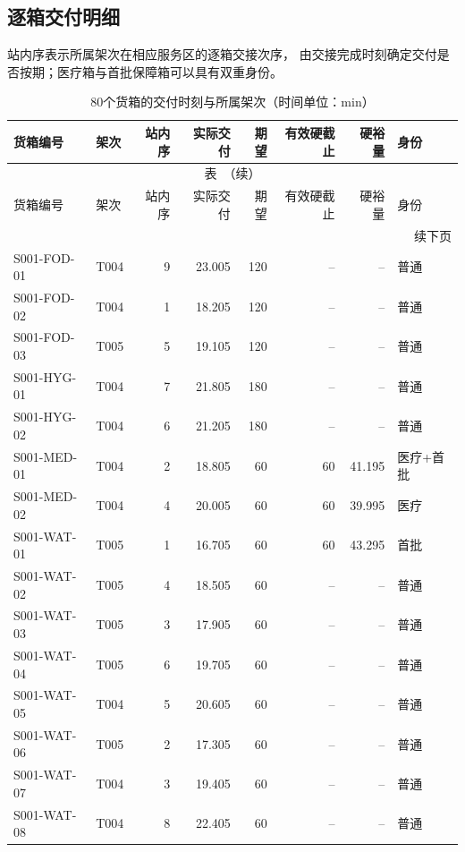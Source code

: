 \subsection{逐箱交付明细}
站内序表示所属架次在相应服务区的逐箱交接次序，
由交接完成时刻确定交付是否按期；医疗箱与首批保障箱可以具有双重身份。
\begingroup
\small
\setlength{\tabcolsep}{3pt}
\renewcommand{\arraystretch}{1.10}
\begin{longtable}{@{}llrrrrrl@{}}
\caption{80个货箱的交付时刻与所属架次（时间单位：min）}\label{tab:q3-deliveries}\\
\toprule
货箱编号 & 架次 & 站内序 & 实际交付 & 期望 & 有效硬截止 & 硬裕量 & 身份 \\
\midrule
\endfirsthead
\multicolumn{8}{c}{\small 表~\thetable{}（续）}\\
\toprule
货箱编号 & 架次 & 站内序 & 实际交付 & 期望 & 有效硬截止 & 硬裕量 & 身份 \\
\midrule
\endhead
\midrule
\multicolumn{8}{r}{\small 续下页}\\
\endfoot
\bottomrule
\endlastfoot
S001-FOD-01 & T004 & 9 & 23.005 & 120 & -- & -- & 普通 \\
S001-FOD-02 & T004 & 1 & 18.205 & 120 & -- & -- & 普通 \\
S001-FOD-03 & T005 & 5 & 19.105 & 120 & -- & -- & 普通 \\
S001-HYG-01 & T004 & 7 & 21.805 & 180 & -- & -- & 普通 \\
S001-HYG-02 & T004 & 6 & 21.205 & 180 & -- & -- & 普通 \\
S001-MED-01 & T004 & 2 & 18.805 & 60 & 60 & 41.195 & 医疗+首批 \\
S001-MED-02 & T004 & 4 & 20.005 & 60 & 60 & 39.995 & 医疗 \\
S001-WAT-01 & T005 & 1 & 16.705 & 60 & 60 & 43.295 & 首批 \\
S001-WAT-02 & T005 & 4 & 18.505 & 60 & -- & -- & 普通 \\
S001-WAT-03 & T005 & 3 & 17.905 & 60 & -- & -- & 普通 \\
S001-WAT-04 & T005 & 6 & 19.705 & 60 & -- & -- & 普通 \\
S001-WAT-05 & T004 & 5 & 20.605 & 60 & -- & -- & 普通 \\
S001-WAT-06 & T005 & 2 & 17.305 & 60 & -- & -- & 普通 \\
S001-WAT-07 & T004 & 3 & 19.405 & 60 & -- & -- & 普通 \\
S001-WAT-08 & T004 & 8 & 22.405 & 60 & -- & -- & 普通 \\

\end{longtable}
